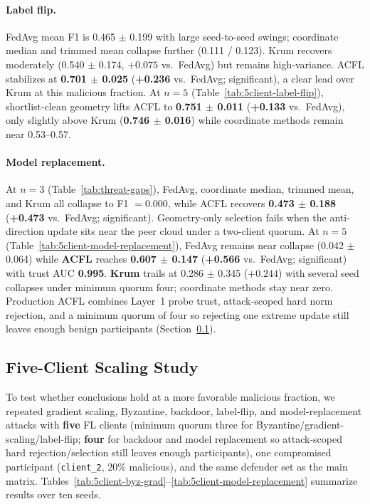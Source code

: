\paragraph{Label flip.}
FedAvg mean F1 is 0.465 $\pm$ 0.199 with large seed-to-seed swings; coordinate median and trimmed mean collapse further (0.111 / 0.123).
Krum recovers moderately (0.540 $\pm$ 0.174, $+0.075$ vs.\ FedAvg) but remains high-variance.
ACFL stabilizes at \textbf{0.701 $\pm$ 0.025} (\textbf{+0.236} vs.\ FedAvg; significant), a clear lead over Krum at this malicious fraction.
At $n{=}5$ (Table~\ref{tab:5client-label-flip}), shortlist-clean geometry lifts ACFL to \textbf{0.751 $\pm$ 0.011} (\textbf{+0.133} vs.\ FedAvg), only slightly above Krum (\textbf{0.746 $\pm$ 0.016}) while coordinate methods remain near 0.53--0.57.

\paragraph{Model replacement.}
At $n{=}3$ (Table~\ref{tab:threat-gaps}), FedAvg, coordinate median, trimmed mean, and Krum all collapse to F1 $= 0.000$, while ACFL recovers \textbf{0.473 $\pm$ 0.188} (\textbf{+0.473} vs.\ FedAvg; significant).
Geometry-only selection fails when the anti-direction update sits near the peer cloud under a two-client quorum.
At $n{=}5$ (Table~\ref{tab:5client-model-replacement}), FedAvg remains near collapse (0.042 $\pm$ 0.064) while \textbf{ACFL} reaches \textbf{0.607 $\pm$ 0.147} (\textbf{+0.566} vs.\ FedAvg; significant) with trust AUC \textbf{0.995}.
\textbf{Krum} trails at 0.286 $\pm$ 0.345 ($+0.244$) with several seed collapses under minimum quorum four; coordinate methods stay near zero.
Production ACFL combines Layer~1 probe trust, attack-scoped hard norm rejection, and a minimum quorum of four so rejecting one extreme update still leaves enough benign participants (Section~\ref{sec:exp-5client}).

\subsection{Five-Client Scaling Study}
\label{sec:exp-5client}

To test whether conclusions hold at a more favorable malicious fraction, we repeated gradient scaling, Byzantine, backdoor, label-flip, and model-replacement attacks with \textbf{five} FL clients (minimum quorum three for Byzantine/gradient-scaling/label-flip; \textbf{four} for backdoor and model replacement so attack-scoped hard rejection/selection still leaves enough participants), one compromised participant (\texttt{client\_2}, 20\% malicious), and the same defender set as the main matrix.
Tables~\ref{tab:5client-byz-grad}--\ref{tab:5client-model-replacement} summarize results over ten seeds.

